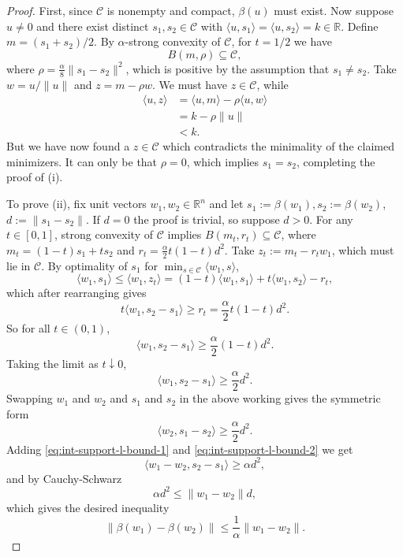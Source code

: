 \documentclass[pdflatex,sn-mathphys-num]{sn-jnl}%
\newcommand\C{\mathcal{C}}
\theoremstyle{thmstyleone}%
\theoremstyle{thmstyletwo}%
\theoremstyle{thmstylethree}%
\begin{document}
\begin{proof}
  First, since $\C$ is nonempty and compact, $\beta(u)$ must exist. Now suppose $u \neq 0$ and there exist distinct $s_1,s_2 \in \C$ with
  $\langle{u,s_1}\rangle = \langle{u,s_2}\rangle = k \in \mathbb{R}$. Define $m = (s_1 + s_2)/2$. By $\alpha$-strong convexity of $\C$, for $t=1/2$ we have
  \[
    B(m,\rho) \subseteq \C,
  \]
  where $\rho = \frac{\alpha}{8}\lVert s_1 - s_2\rVert^2$, which is positive by the assumption that $s_1 \neq s_2$. Take $w = u/\lVert u\rVert$ and
  $z = m - \rho w$. We must have $z \in \C$, while
  \begin{align*}
    \langle{u,z}\rangle &= \langle{u,m}\rangle - \rho\langle{u,w}\rangle\\
                        &= k - \rho\lVert u\rVert\\
                        &< k.
  \end{align*}
  But we have now found a $z\in \C$ which contradicts the minimality of the claimed minimizers. It can only be that $\rho = 0$, which implies $s_1 = s_2$, completing the proof of (i).

  To prove (ii), fix unit vectors $w_1, w_2 \in \mathbb{R}^n$ and let $s_1 := \beta(w_1), s_2 := \beta(w_2)$, $d := \lVert s_1 - s_2\rVert$.
  If $d = 0$ the proof is trivial, so suppose $d > 0$.
  For any $t \in [0,1]$, strong convexity of $\C$ implies $B(m_t, r_t) \subseteq \C$, where
  $m_t = (1-t)s_1 + ts_2$ and $r_t = \frac{\alpha}{2}t(1-t)d^2$. Take $z_t := m_t - r_t w_1$, which must lie in $\C$.
  By optimality of $s_1$ for $\min_{s\in \C}\langle{w_1,s}\rangle$,
  \[
    \langle{w_1,s_1}\rangle \leq \langle{w_1, z_t}\rangle = (1-t)\langle{w_1,s_1}\rangle + t\langle{w_1,s_2}\rangle - r_t,
  \]
  which after rearranging gives
  \[
    t\langle{w_1, s_2 - s_1}\rangle \geq r_t = \frac{\alpha}{2}t(1-t)d^2.
  \]
  So for all $t \in (0,1)$,
  \[
    \langle{w_1,s_2 - s_1}\rangle \geq \frac{\alpha}{2}(1-t)d^2.
  \]
  Taking the limit as $t \downarrow 0$, 
  \begin{equation} \label{eq:int-support-l-bound-1}
    \langle{w_1,s_2 - s_1}\rangle \geq \frac{\alpha}{2}d^2.
  \end{equation}
  Swapping $w_1$ and $w_2$ and $s_1$ and $s_2$ in the above working gives the symmetric form
  \begin{equation} \label{eq:int-support-l-bound-2}
    \langle{w_2,s_1 - s_2}\rangle \geq \frac{\alpha}{2}d^2.
  \end{equation}
  Adding \eqref{eq:int-support-l-bound-1} and \eqref{eq:int-support-l-bound-2} we get
  \[
    \langle{w_1 - w_2, s_2 - s_1}\rangle \geq \alpha d^2,
  \]
  and by Cauchy-Schwarz
  \[
    \alpha d^2 \leq \lVert w_1 - w_2\rVert d,
  \]
  which gives the desired inequality
  \[
    \lVert \beta(w_1) - \beta(w_2)\rVert \leq \frac{1}{\alpha}\lVert w_1 - w_2\rVert.
  \]
\end{proof}
\end{document}
